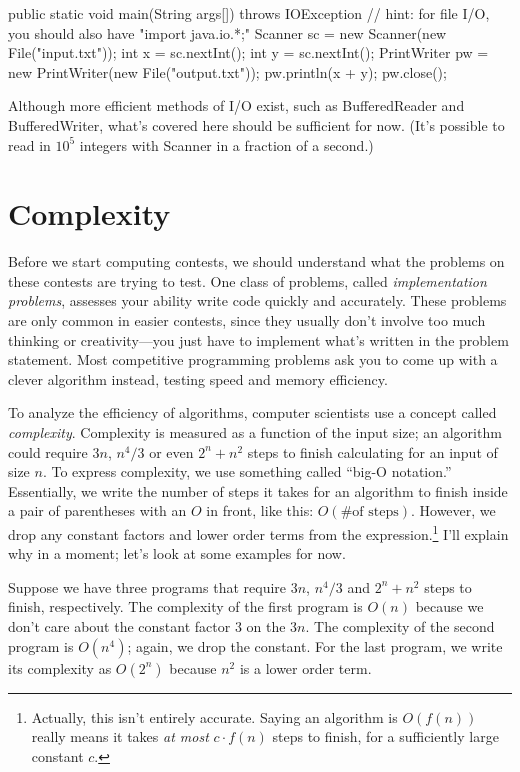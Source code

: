 \begin{mylstlisting}
public static void main(String args[]) throws IOException {
  // hint: for file I/O, you should also have "import java.io.*;"
  Scanner sc = new Scanner(new File("input.txt"));
  int x = sc.nextInt();
  int y = sc.nextInt();
  PrintWriter pw = new PrintWriter(new File("output.txt"));
  pw.println(x + y);
  pw.close();
}
\end{mylstlisting}

Although more efficient methods of I/O exist, such as BufferedReader and BufferedWriter, what's covered here should be sufficient for now. (It's possible to read in $10^5$ integers with Scanner in a fraction of a second.)

\section{Complexity}

Before we start computing contests, we should understand what the problems on these contests are trying to test. One class of problems, called \emph{implementation problems}, assesses your ability write code quickly and accurately. These problems are only common in easier contests, since they usually don't involve too much thinking or creativity---you just have to implement what's written in the problem statement. Most competitive programming problems ask you to come up with a clever algorithm instead, testing speed and memory efficiency.

To analyze the efficiency of algorithms, computer scientists use a concept called \emph{complexity}. Complexity is measured as a function of the input size; an algorithm could require $3n$, $n^4/3$ or even $2^n + n^2$ steps to finish calculating for an input of size $n$. To express complexity, we use something called ``big-O notation.'' Essentially, we write the number of steps it takes for an algorithm to finish inside a pair of parentheses with an $O$ in front, like this: $O(\text{\# of steps})$. However, we drop any constant factors and lower order terms from the expression.\footnote{Actually, this isn't entirely accurate. Saying an algorithm is $O(f(n))$ really means it takes \emph{at most} $c\cdot f(n)$ steps to finish, for a sufficiently large constant $c$.} I'll explain why in a moment; let's look at some examples for now. 

Suppose we have three programs that require $3n$, $n^4/3$ and $2^n + n^2$ steps to finish, respectively. The complexity of the first program is $O(n)$ because we don't care about the constant factor $3$ on the $3n$. The complexity of the second program is $O(n^4)$; again, we drop the constant. For the last program, we write its complexity as $O(2^n)$ because $n^2$ is a lower order term.

